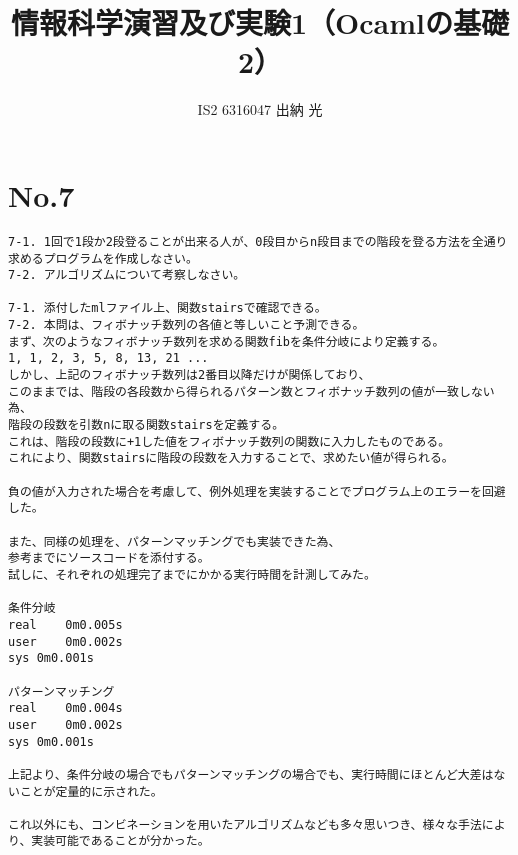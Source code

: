\documentclass{jarticle}
\title{情報科学演習及び実験1（Ocamlの基礎2）}
\author{IS2 6316047 出納 光}
\begin{document}
\maketitle

\section{No.7}
\begin{verbatim}
7-1. 1回で1段か2段登ることが出来る人が、0段目からn段目までの階段を登る方法を全通り求めるプログラムを作成しなさい。
7-2. アルゴリズムについて考察しなさい。

7-1. 添付したmlファイル上、関数stairsで確認できる。
7-2. 本問は、フィボナッチ数列の各値と等しいこと予測できる。
まず、次のようなフィボナッチ数列を求める関数fibを条件分岐により定義する。
1, 1, 2, 3, 5, 8, 13, 21 ...
しかし、上記のフィボナッチ数列は2番目以降だけが関係しており、
このままでは、階段の各段数から得られるパターン数とフィボナッチ数列の値が一致しない為、
階段の段数を引数nに取る関数stairsを定義する。
これは、階段の段数に+1した値をフィボナッチ数列の関数に入力したものである。
これにより、関数stairsに階段の段数を入力することで、求めたい値が得られる。

負の値が入力された場合を考慮して、例外処理を実装することでプログラム上のエラーを回避した。

また、同様の処理を、パターンマッチングでも実装できた為、
参考までにソースコードを添付する。
試しに、それぞれの処理完了までにかかる実行時間を計測してみた。

条件分岐
real	0m0.005s
user	0m0.002s
sys	0m0.001s

パターンマッチング
real	0m0.004s
user	0m0.002s
sys	0m0.001s

上記より、条件分岐の場合でもパターンマッチングの場合でも、実行時間にほとんど大差はないことが定量的に示された。

これ以外にも、コンビネーションを用いたアルゴリズムなども多々思いつき、様々な手法により、実装可能であることが分かった。

\end{verbatim}

\newpage
\end{document}
